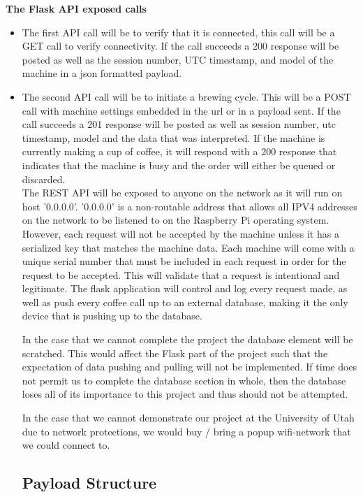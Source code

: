 \documentclass[conference]{IEEEtran}
\begin{document}
\indent\textbf{The Flask API exposed calls} \\ 
\begin{itemize}
\item The first API call will be to verify that it is connected, this call will
be a GET call to verify connectivity. If the call succeeds a 200 response will
be posted as well as the session number, UTC timestamp, and model of the
machine in a json formatted payload.

\item The second API call will be to initiate a brewing cycle. 
This will be a POST call with machine settings embedded in the url or in a payload sent. If the
call succeeds a 201 response will be posted as well as session number, utc
timestamp, model and the data that was interpreted. If the machine is currently
making a cup of coffee, it will respond with a 200 response that indicates that
the machine is busy and the order will either be queued or discarded.
\ \\

The REST API will be exposed to anyone on the network as it will run on host
'0.0.0.0'. '0.0.0.0' is a non-routable address that allows all IPV4 addresses
on the network to be listened to on the Raspberry Pi operating system.
However, each request will not be accepted by the machine unless it has a
serialized key that matches the machine data. Each machine will come with a
unique serial number that must be included in each request in order for the
request to be accepted. This will validate that a request is intentional and
legitimate.
The flask application will control and log every request made, as well as push
every coffee call up to an external database, making it the only device that is
pushing up to the database.

 In the case that we cannot complete the project the database element will be
scratched. This would affect the Flask part of the project such that the
expectation of data pushing and pulling will not be implemented.
If time does not permit us to complete the database section in whole, then the database loses all 
of its importance to this project and thus should not be attempted.

In the case that we cannot demonstrate our project at the University of Utah due to network protections,
we would buy / bring a popup wifi-network that we could connect to.

\subsection{Payload Structure}

\end{itemize}
\end{document}

